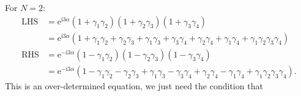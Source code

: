 \documentclass{book}
\begin{document}
For $N=2$:
\begin{equation*}
\begin{aligned}
\mathrm{LHS} & \mathrm{=e}^{\mathrm{i} 3\alpha }( 1+\gamma _{1} \gamma _{2})( 1+\gamma _{2} \gamma _{3})( 1+\gamma _{3} \gamma _{4})\\
 & =\mathrm{e}^{\mathrm{i} 3\alpha }( 1+\gamma _{1} \gamma _{2} +\gamma _{2} \gamma _{3} +\gamma _{1} \gamma _{3} +\gamma _{3} \gamma _{4} +\gamma _{2} \gamma _{4} +\gamma _{1} \gamma _{4} +\gamma _{1} \gamma _{2} \gamma _{3} \gamma _{4})\\
\mathrm{RHS} & =\mathrm{e}^{-\mathrm{i} 3\alpha }( 1-\gamma _{1} \gamma _{2})( 1-\gamma _{2} \gamma _{3})( 1-\gamma _{3} \gamma _{4})\\
 & =\mathrm{e}^{-\mathrm{i} 3\alpha }( 1-\gamma _{1} \gamma _{2} -\gamma _{2} \gamma _{3} +\gamma _{1} \gamma _{3} -\gamma _{3} \gamma _{4} +\gamma _{2} \gamma _{4} -\gamma _{1} \gamma _{4} +\gamma _{1} \gamma _{2} \gamma _{3} \gamma _{4}) .
\end{aligned}
\end{equation*}
This is an over-determined equation, we just need the condition that
\end{document}
